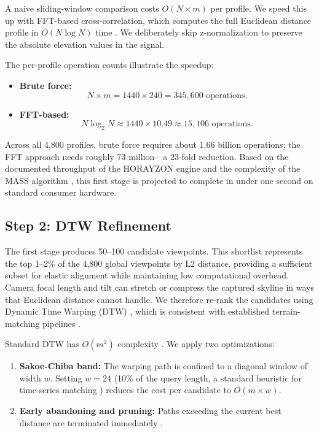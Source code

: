 A naive sliding-window comparison costs $O(N \times m)$ per profile. We speed this up with FFT-based cross-correlation, which computes the full Euclidean distance profile in $O(N \log N)$ time \cite{mueen2024mass}. We deliberately skip z-normalization to preserve the absolute elevation values in the signal.

The per-profile operation counts illustrate the speedup:
\begin{itemize}
    \item \textbf{Brute force:}
    \[
    N \times m = 1440 \times 240 = 345{,}600 \text{ operations.}
    \]
    \item \textbf{FFT-based:}
    \[
    N \log_2 N \approx 1440 \times 10.49 \approx 15{,}106 \text{ operations.}
    \]
\end{itemize}

Across all 4,800 profiles, brute force requires about 1.66 billion operations; the FFT approach needs roughly 73 million---a 23-fold reduction. Based on the documented throughput of the HORAYZON engine \cite{Steger2022} and the complexity of the MASS algorithm \cite{mueen2024mass}, this first stage is projected to complete in under one second on standard consumer hardware.

\subsection{Step 2: DTW Refinement}
The first stage produces 50--100 candidate viewpoints. This shortlist represents the top 1--2\% of the 4,800 global viewpoints by L2 distance, providing a sufficient subset for elastic alignment while maintaining low computational overhead. Camera focal length and tilt can stretch or compress the captured skyline in ways that Euclidean distance cannot handle. We therefore re-rank the candidates using Dynamic Time Warping (DTW) \cite{Rakthanmanon2013}, which is consistent with established terrain-matching pipelines \cite{pan2020camera}.

Standard DTW has $O(m^2)$ complexity \cite{Rakthanmanon2013}. We apply two optimizations:
\begin{enumerate}
    \item \textbf{Sakoe-Chiba band:} The warping path is confined to a diagonal window of width $w$. Setting $w = 24$ (10\% of the query length, a standard heuristic for time-series matching \cite{Rakthanmanon2013}) reduces the cost per candidate to $O(m \times w)$.
    \item \textbf{Early abandoning and pruning:} Paths exceeding the current best distance are terminated immediately \cite{Rakthanmanon2013}.
\end{enumerate}

